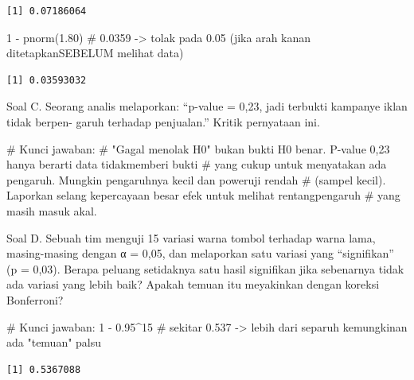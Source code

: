 \documentclass[
  indonesian,
  letterpaper,
]{book}
\newenvironment{Shaded}{\begin{snugshade}}{\end{snugshade}}
\newcommand{\CommentTok}[1]{\textcolor[rgb]{0.37,0.37,0.37}{#1}}
\newcommand{\DecValTok}[1]{\textcolor[rgb]{0.68,0.00,0.00}{#1}}
\newcommand{\FloatTok}[1]{\textcolor[rgb]{0.68,0.00,0.00}{#1}}
\newcommand{\FunctionTok}[1]{\textcolor[rgb]{0.28,0.35,0.67}{#1}}
\newcommand{\NormalTok}[1]{\textcolor[rgb]{0.00,0.23,0.31}{#1}}
\newcommand{\SpecialCharTok}[1]{\textcolor[rgb]{0.37,0.37,0.37}{#1}}
\begin{document}
\begin{verbatim}
[1] 0.07186064
\end{verbatim}

\begin{Shaded}
\begin{Highlighting}[]
\DecValTok{1} \SpecialCharTok{{-}} \FunctionTok{pnorm}\NormalTok{(}\FloatTok{1.80}\NormalTok{) }\CommentTok{\# 0.0359 {-}\textgreater{} tolak pada 0.05 (jika arah kanan ditetapkanSEBELUM melihat data)}
\end{Highlighting}
\end{Shaded}

\begin{verbatim}
[1] 0.03593032
\end{verbatim}

Soal C. Seorang analis melaporkan: ``p-value = 0,23, jadi terbukti
kampanye iklan tidak berpen- garuh terhadap penjualan.'' Kritik
pernyataan ini.

\begin{Shaded}
\begin{Highlighting}[]
\CommentTok{\# Kunci jawaban:}
\CommentTok{\# "Gagal menolak H0" bukan bukti H0 benar. P{-}value 0,23 hanya berarti data tidakmemberi bukti}
\CommentTok{\# yang cukup untuk menyatakan ada pengaruh. Mungkin pengaruhnya kecil dan poweruji rendah}
\CommentTok{\# (sampel kecil). Laporkan selang kepercayaan besar efek untuk melihat rentangpengaruh}
\CommentTok{\# yang masih masuk akal.}
\end{Highlighting}
\end{Shaded}

Soal D. Sebuah tim menguji 15 variasi warna tombol terhadap warna lama,
masing-masing dengan α = 0,05, dan melaporkan satu variasi yang
``signifikan'' (p = 0,03). Berapa peluang setidaknya satu hasil
signifikan jika sebenarnya tidak ada variasi yang lebih baik? Apakah
temuan itu meyakinkan dengan koreksi Bonferroni?

\begin{Shaded}
\begin{Highlighting}[]
\CommentTok{\# Kunci jawaban:}
\DecValTok{1} \SpecialCharTok{{-}} \FloatTok{0.95}\SpecialCharTok{\^{}}\DecValTok{15} \CommentTok{\# sekitar 0.537 {-}\textgreater{} lebih dari separuh kemungkinan ada "temuan" palsu}
\end{Highlighting}
\end{Shaded}

\begin{verbatim}
[1] 0.5367088
\end{verbatim}
\end{document}
